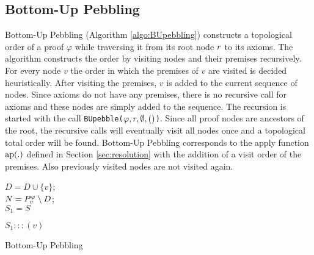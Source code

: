 \begin{example}
\label{example:TDPIssue}
\end{example}

\subsection{Bottom-Up Pebbling}

Bottom-Up Pebbling (Algorithm \ref{algo:BUpebbling}) constructs a topological order of a proof $\varphi$ while traversing it from its root node $r$ to its axioms. 
The algorithm constructs the order by visiting nodes and their premises recursively. 
For every node $v$ the order in which the premises of $v$ are visited is decided heuristically. 
After visiting the premises, $v$ is added to the current sequence of nodes.
Since axioms do not have any premises, there is no recursive call for axioms and these nodes are simply added to the sequence. 
The recursion is started with the call \texttt{BUpebble($\varphi,r,\emptyset,()$)}.
Since all proof nodes are ancestors of the root, the recursive calls will eventually visit all nodes once and a topological total order will be found.
Bottom-Up Pebbling corresponds to the apply function $\operatorname{ap}(.)$ defined in Section \ref{sec:resolution} with the addition of a visit order of the premises.
Also previously visited nodes are not visited again.


%
%

\begin{algorithm}[h]
	
	$D = D \cup \{v\}$; \\
	$N = P_{v}^{\varphi} \setminus D$;  \\
	$S_1 = S$\;
	
	
	\Return $S_1 ::: (v)$\;
	
  \caption{Bottom-Up Pebbling}
	\label{algo:BUpebbling}
  
\end{algorithm}

